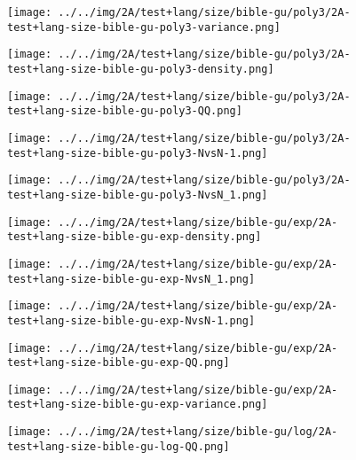 \begin{figure}[H]
\centering	\texttt{[image: ../../img/2A/test+lang/size/bible-gu/poly3/2A-test+lang-size-bible-gu-poly3-variance.png]}
\end{figure}
\begin{figure}[H]
\centering	\texttt{[image: ../../img/2A/test+lang/size/bible-gu/poly3/2A-test+lang-size-bible-gu-poly3-density.png]}
\end{figure}
\begin{figure}[H]
\centering	\texttt{[image: ../../img/2A/test+lang/size/bible-gu/poly3/2A-test+lang-size-bible-gu-poly3-QQ.png]}
\end{figure}
\begin{figure}[H]
\centering	\texttt{[image: ../../img/2A/test+lang/size/bible-gu/poly3/2A-test+lang-size-bible-gu-poly3-NvsN-1.png]}
\end{figure}
\begin{figure}[H]
\centering	\texttt{[image: ../../img/2A/test+lang/size/bible-gu/poly3/2A-test+lang-size-bible-gu-poly3-NvsN\_1.png]}
\end{figure}
\begin{figure}[H]
\centering	\texttt{[image: ../../img/2A/test+lang/size/bible-gu/exp/2A-test+lang-size-bible-gu-exp-density.png]}
\end{figure}
\begin{figure}[H]
\centering	\texttt{[image: ../../img/2A/test+lang/size/bible-gu/exp/2A-test+lang-size-bible-gu-exp-NvsN\_1.png]}
\end{figure}
\begin{figure}[H]
\centering	\texttt{[image: ../../img/2A/test+lang/size/bible-gu/exp/2A-test+lang-size-bible-gu-exp-NvsN-1.png]}
\end{figure}
\begin{figure}[H]
\centering	\texttt{[image: ../../img/2A/test+lang/size/bible-gu/exp/2A-test+lang-size-bible-gu-exp-QQ.png]}
\end{figure}
\begin{figure}[H]
\centering	\texttt{[image: ../../img/2A/test+lang/size/bible-gu/exp/2A-test+lang-size-bible-gu-exp-variance.png]}
\end{figure}
\begin{figure}[H]
\centering	\texttt{[image: ../../img/2A/test+lang/size/bible-gu/log/2A-test+lang-size-bible-gu-log-QQ.png]}
\end{figure}
